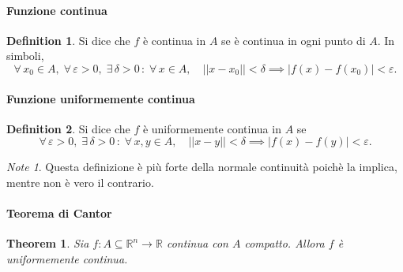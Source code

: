 \documentclass{article}
\theoremstyle{plain}
\newtheorem{thm}{Theorem}[section]
\theoremstyle{definition}
\newtheorem{defn}{Definition}[section]
\theoremstyle{remark}
\newtheorem{note}{Note}
\begin{document}
\vspace{10pt}

\paragraph{Funzione continua}
\begin{bxthm}
\begin{defn}
    Si dice che $f$ è continua in $A$ se è continua in ogni punto di $A$.
    In simboli,
    \[\forall\, x_0\in A,\;\forall\,\varepsilon>0,\;\exists\,\delta>0\,:\;\forall\, x\in A,\quad|| x-x_0 ||<\delta \implies|f(x)-f(x_0)|<\varepsilon.\]
\end{defn}
\end{bxthm}

\vspace{10pt}

\paragraph{Funzione uniformemente continua}
\begin{bxthm}
\begin{defn}
    Si dice che $f$ è uniformemente continua in $A$ se 
    \[\forall\,\varepsilon>0,\;\exists\,\delta>0\,:\;\forall\, x,y\in A,\quad|| x-y ||<\delta\implies |f(x)-f(y)|<\varepsilon.\]
\end{defn}
\end{bxthm}

\vspace{10pt}

\begin{note}
    Questa definizione è più forte della normale continuità poichè la implica, mentre non è vero il contrario.
\end{note}

\vspace{10pt}

\paragraph{Teorema di Cantor}
\begin{bxthm}
\begin{thm}
    Sia $f:A\subseteq\mathbb{R}^n\to\mathbb{R}$ continua con $A$ compatto.
    Allora $f$ è uniformemente continua.
\end{thm}
\end{bxthm}

\vspace{10pt}
\end{document}
